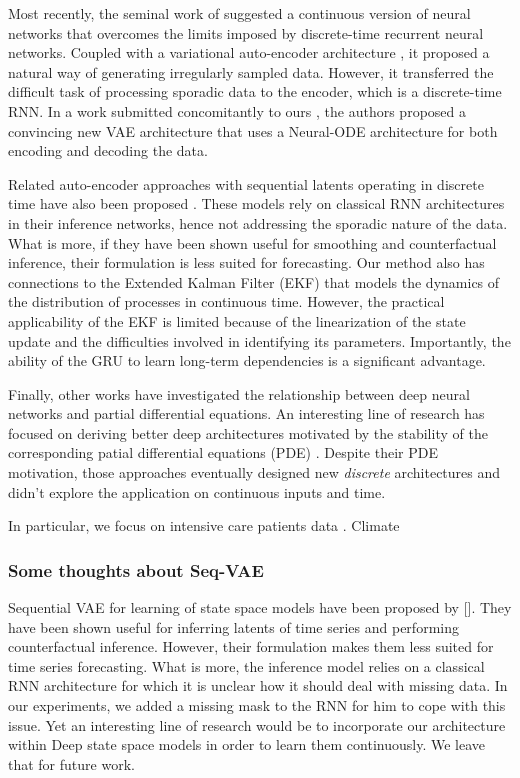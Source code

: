 \documentclass{article}
\begin{document}
Most recently, the seminal work of \citet{neural_ode} suggested a continuous version of neural networks that overcomes the limits imposed by discrete-time recurrent neural networks. Coupled with a variational auto-encoder architecture \citep{kingma2013auto}, it proposed a natural way of generating irregularly sampled data. However, it transferred the difficult task of processing sporadic data to the encoder, which is a discrete-time RNN. In a work submitted concomitantly to ours \citep{rubanova2019latent}, the authors proposed a convincing new VAE architecture that uses a Neural-ODE architecture for both encoding and decoding the data.

Related auto-encoder approaches with sequential latents operating in discrete time have also been proposed \citep{krishnan2015deep,krishnan2017structured}. These models rely on classical RNN architectures in their inference networks, hence not addressing the sporadic nature of the data. What is more, if they have been shown useful for smoothing and counterfactual inference, their formulation is less suited for forecasting. Our method also has connections to the Extended Kalman Filter (EKF) that models the dynamics of the distribution of processes in continuous time. However, the practical applicability of the EKF is limited because of the linearization of the state update and the difficulties involved in identifying its parameters. Importantly, the ability of the GRU to learn long-term dependencies is a significant advantage. 

Finally, other works have investigated the relationship between deep neural networks and partial differential equations. An interesting line of research has focused on deriving better deep architectures motivated by the stability of the corresponding patial differential equations (PDE) \citep{haber2017stable,chang2019antisymmetricrnn}. Despite their PDE motivation, those approaches eventually designed new \emph{discrete} architectures and didn't explore the application on continuous inputs and time.




\iffalse
 In particular, we focus on intensive care patients data \citep{yoon2016forecasticu,pham2016deepcare,mei2017neural}. Climate 
\subsubsection{Some thoughts about Seq-VAE}

Sequential VAE for learning of state space models have been proposed by []. They have been shown useful for inferring latents of time series and performing counterfactual inference. However, their formulation makes them less suited for time series forecasting. What is more, the inference model relies on a classical RNN architecture for which it is unclear how it should deal with missing data. In our experiments, we added a missing mask to the RNN for him to cope with this issue. Yet an interesting line of research would be to incorporate our architecture within Deep state space models in order to learn them continuously. We leave that for future work.
\end{document}
